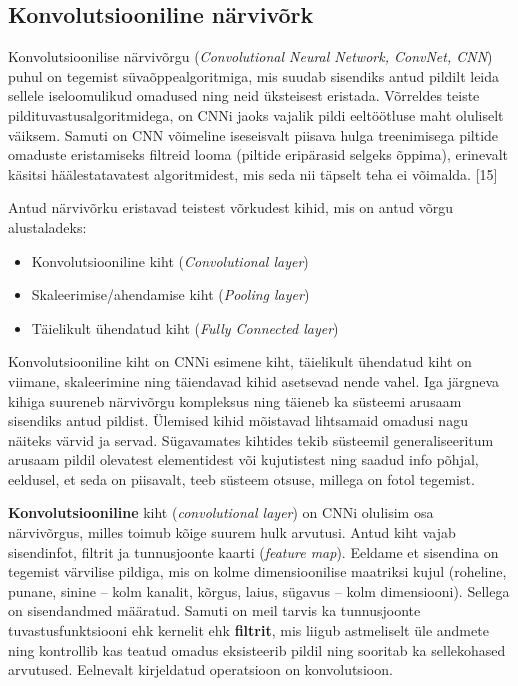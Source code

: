 \documentclass[12pt,a4paper]{report}
\begin{document}
\subsection{Konvolutsiooniline närvivõrk}\label{konvolutsiooniline-nuxe4rvivuxf5rk}

Konvolutsioonilise närvivõrgu (\emph{Convolutional Neural Network, ConvNet, CNN}) puhul on tegemist süvaõppealgoritmiga, mis suudab sisendiks antud pildilt leida sellele iseloomulikud omadused ning neid üksteisest eristada. Võrreldes teiste pildituvastusalgoritmidega, on CNNi jaoks vajalik pildi eeltöötluse maht oluliselt väiksem. Samuti on CNN võimeline iseseisvalt piisava hulga treenimisega piltide omaduste eristamiseks filtreid looma (piltide eripärasid selgeks õppima), erinevalt käsitsi häälestatavatest algoritmidest, mis seda nii täpselt teha ei võimalda. {[}15{]}

Antud närvivõrku eristavad teistest võrkudest kihid, mis on antud võrgu alustaladeks:

\begin{itemize}
\item
  Konvolutsiooniline kiht (\emph{Convolutional layer})
\item
  Skaleerimise/ahendamise kiht (\emph{Pooling layer})
\item
  Täielikult ühendatud kiht (\emph{Fully Connected layer})
\end{itemize}

Konvolutsiooniline kiht on CNNi esimene kiht, täielikult ühendatud kiht on viimane, skaleerimine ning täiendavad kihid asetsevad nende vahel. Iga järgneva kihiga suureneb närvivõrgu kompleksus ning täieneb ka süsteemi arusaam sisendiks antud pildist. Ülemised kihid mõistavad lihtsamaid omadusi nagu näiteks värvid ja servad. Sügavamates kihtides tekib süsteemil generaliseeritum arusaam pildil olevatest elementidest või kujutistest ning saadud info põhjal, eeldusel, et seda on piisavalt, teeb süsteem otsuse, millega on fotol tegemist.

\textbf{Konvolutsiooniline} kiht (\emph{convolutional layer}) on CNNi olulisim osa närvivõrgus, milles toimub kõige suurem hulk arvutusi. Antud kiht vajab sisendinfot, filtrit ja tunnusjoonte kaarti (\emph{feature map}). Eeldame et sisendina on tegemist värvilise pildiga, mis on kolme dimensioonilise maatriksi kujul (roheline, punane, sinine -- kolm kanalit, kõrgus, laius, sügavus -- kolm dimensiooni). Sellega on sisendandmed määratud. Samuti on meil tarvis ka tunnusjoonte tuvastusfunktsiooni ehk kernelit ehk \textbf{filtrit}, mis liigub astmeliselt üle andmete ning kontrollib kas teatud omadus eksisteerib pildil ning sooritab ka sellekohased arvutused. Eelnevalt kirjeldatud operatsioon on konvolutsioon.
\end{document}

